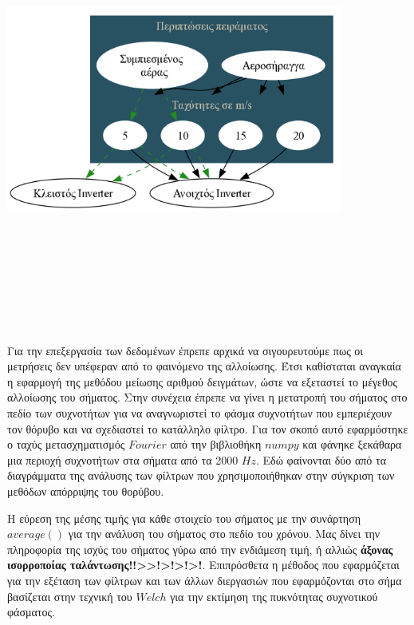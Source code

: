 \documentclass[breaklines=true, 12pt]{article}
\begin{document}
\begin{center}
\includegraphics[width=420px,height=550px]{./flowcharts/test-first.png}
\end{center}

Για την επεξεργασία των δεδομένων έπρεπε αρχικά να σιγουρευτούμε πως οι
μετρήσεις δεν υπέφεραν από το φαινόμενο της αλλοίωσης. Έτσι καθίσταται
αναγκαία η εφαρμογή της μεθόδου μείωσης αριθμού δειγμάτων, ώστε να εξεταστεί
το μέγεθος αλλοίωσης του σήματος. Στην συνέχεια έπρεπε να γίνει η μετατροπή
του σήματος στο πεδίο των συχνοτήτων για να αναγνωριστεί το φάσμα συχνοτήτων
που εμπεριέχουν τον θόρυβο και να σχεδιαστεί το κατάλληλο φίλτρο. Για τον σκοπό
αυτό εφαρμόστηκε ο ταχύς μετασχηματισμός \(Fourier\) από την βιβλιοθήκη \(numpy\) και
φάνηκε ξεκάθαρα μια περιοχή συχνοτήτων στα σήματα από τα 2000 \(Hz\).
Εδώ φαίνονται δύο από τα διαγράμματα της ανάλυσης των φίλτρων που
χρησιμοποιήθηκαν στην σύγκριση των μεθόδων απόρριψης του θορύβου.

Η εύρεση της μέσης τιμής για κάθε στοιχείο του
σήματος με την συνάρτηση \(average()\) για την ανάλυση του σήματος στο πεδίο του
χρόνου. Μας δίνει την πληροφορία της ισχύς του σήματος γύρω από την ενδιάμεση
τιμή, ή αλλιώς \textbf{άξονας ισορροποίας ταλάντωσης!!>>!>!>!>!}. Επιπρόσθετα η
μέθοδος που εφαρμόζεται για την εξέταση των φίλτρων και των άλλων διεργασιών
που εφαρμόζονται στο σήμα βασίζεται στην τεχνική του \(Welch\) για την εκτίμηση
της πυκνότητας συχνοτικού φάσματος.
\end{document}
